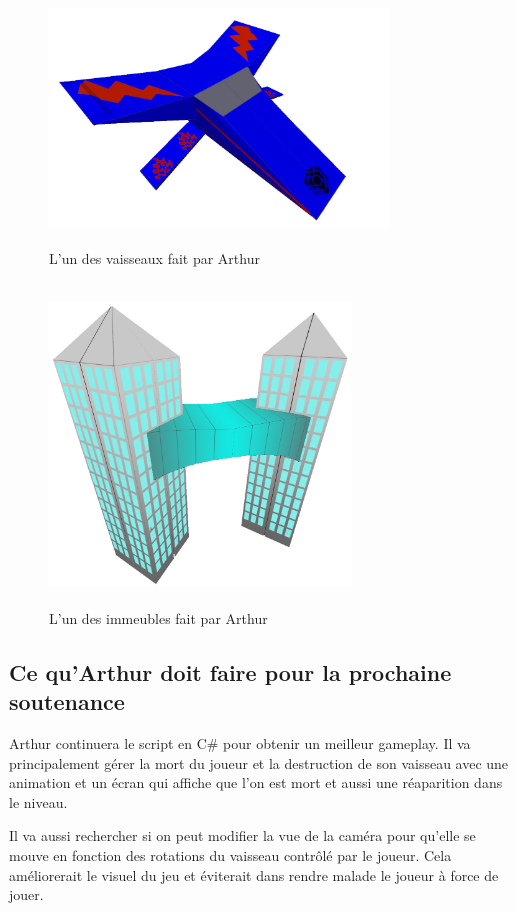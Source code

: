 \documentclass[10pt, titlepage]{report}
\begin{document}
\begin{figure}
\center
\includegraphics[height=6cm, width=9cm]{vaisseau_arthur.jpg}
\caption{L'un des vaisseaux fait par Arthur}

\includegraphics[height=8.5cm, width=8cm]{batiment_arthur.jpg}
\caption{L'un des immeubles fait par Arthur}

\end{figure}

\subsection{Ce qu'Arthur doit faire pour la prochaine soutenance}

Arthur continuera le script en C\# pour obtenir un meilleur gameplay. Il va principalement gérer la mort du joueur et la destruction de son vaisseau avec une animation et un écran qui affiche que l'on est mort et aussi une réaparition dans le niveau. 

 Il va aussi rechercher si on peut modifier la vue de la caméra pour qu'elle se mouve en fonction des rotations du vaisseau contrôlé par le joueur. Cela améliorerait le visuel du jeu et éviterait dans rendre malade le joueur à force de jouer.\\
\end{document}
